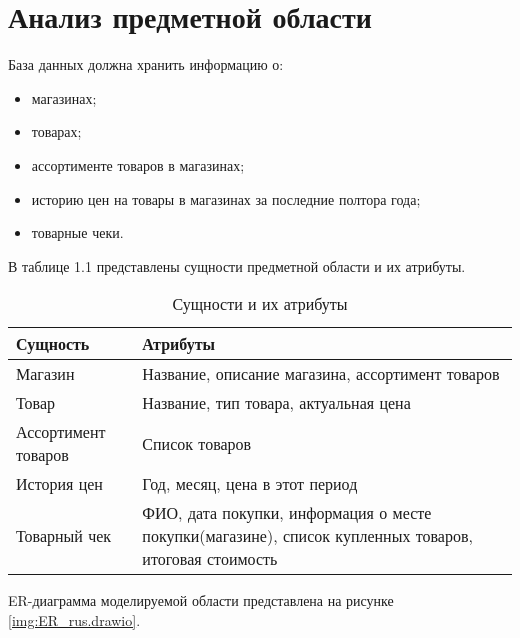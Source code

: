\documentclass{bmstu}
\begin{document}
\section{Анализ предметной области}

База данных должна хранить информацию о:

\begin{itemize}
	\item магазинах;
	\item товарах;
	\item ассортименте товаров в магазинах;
	\item историю цен на товары в магазинах за последние полтора года;
	\item товарные чеки.
\end{itemize}

В таблице 1.1 представлены сущности предметной области и их атрибуты.

\begin{table}[H]
	\caption{Сущности и их атрибуты}
	\begin{center}
		\begin{tabular}{| l | p{11 cm} |} 
			\hline
			
			\textbf{Сущность} & \textbf{Атрибуты} \\  
			
			\hline
			
			Магазин & Название, описание магазина, ассортимент товаров \\
			
			\hline
			
			Товар & Название, тип товара, актуальная цена \\
			
			\hline
			
			Ассортимент товаров & Список товаров \\
			
			\hline
			
			История цен & Год, месяц, цена в этот период \\
			
			\hline
			
			Товарный чек & ФИО, дата покупки, информация о месте покупки(магазине), список купленных товаров, итоговая стоимость \\
			\hline
		\end{tabular}
	\end{center}
\end{table}

ER-диаграмма моделируемой области представлена на рисунке \ref{img:ER_rus.drawio}.
\end{document}
